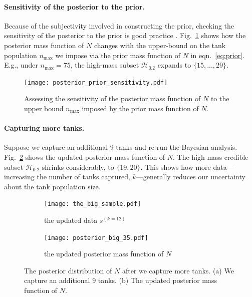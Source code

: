 \documentclass[11pt, oneside]{article}
\begin{document}
\paragraph{Sensitivity of the posterior to the prior.} Because of the subjectivity involved in constructing the prior, checking the sensitivity of the posterior to the prior is good practice \cite{van2021bayesian}. Fig.~\ref{fig:posterior_sensitivity} shows how the posterior mass function of $N$ changes with the upper-bound on the tank population $n_\text{max}$ we impose via the prior mass function of $N$ in eqn.~\ref{eq:prior}. 
E.g., under $n_\text{max} =75$, the high-mass subset $\mathcal{H}_{0.2}$ expands to $\{15, ..., 29\}$.

  \begin{figure}[h!]
        	\centering
	
		\texttt{[image: posterior\_prior\_sensitivity.pdf]}
            \caption{Assessing the sensitivity of the posterior mass function of $N$ to the upper bound $n_{\text{max}}$ imposed by the prior mass function of $N$.} \label{fig:posterior_sensitivity}
\end{figure}

\paragraph{Capturing more tanks.} Suppose we capture an additional 9 tanks and re-run the Bayesian analysis. Fig.~\ref{fig:moretanks} shows the updated posterior mass function of $N$. The high-mass credible subset $\mathcal{H}_{0.2}$ shrinks considerably, to $\{19, 20\}$. This shows how more data---increasing the number of tanks captured, $k$---generally reduces our uncertainty about the tank population size.

  \begin{figure}[h!]
        	\centering
	\begin{subfigure}[b]{0.5\textwidth}
        		\texttt{[image: the\_big\_sample.pdf]}
		\caption{the updated data $s^{(k=12)}$}
	\end{subfigure}
	\begin{subfigure}[b]{0.5\textwidth}
	 \texttt{[image: posterior\_big\_35.pdf]}
	 \caption{the updated posterior mass function of $N$}
	     	\end{subfigure}
            \caption{The posterior distribution of $N$ after we capture more tanks. (a) We capture an additional 9 tanks. (b) The updated posterior mass function of $N$.
            	} \label{fig:moretanks}
\end{figure}
\end{document}
